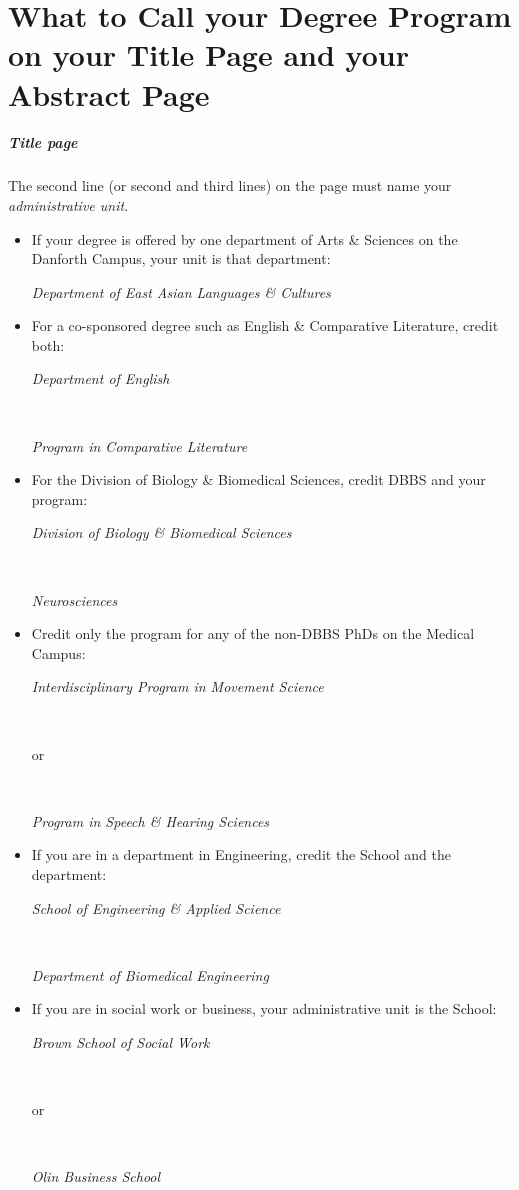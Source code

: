 \chapter[Degree Program]{What to Call your Degree Program on your Title Page and your Abstract Page}
\label{app:degree-program}

\paragraph{Title page}
The second line (or second and third lines) on the page must name your \emph{administrative unit}.

\begin{itemize}
\item If your degree is offered by one department of Arts \& Sciences on the Danforth Campus, your unit is that department: \\
\centerline{\emph{Department of East Asian Languages \& Cultures}}

\item For a co-sponsored degree such as English \& Comparative Literature, credit both: \\
\centerline{\emph{Department of English}}\\
\centerline{\emph{Program in Comparative Literature}}

\item For the Division of Biology \& Biomedical Sciences, credit DBBS and your program: \\
\centerline{\emph{Division of Biology \& Biomedical Sciences}}\\
\centerline{\emph{Neurosciences}}

\item Credit only the program for any of the non-DBBS PhDs on the Medical Campus: \\
\centerline{\emph{Interdisciplinary Program in Movement Science}}\\
\centerline{or}\\
\centerline{\emph{Program in Speech \& Hearing Sciences}}

\item If you are in a department in Engineering, credit the School and the department: \\
\centerline{\emph{School of Engineering \& Applied Science}}\\
\centerline{\emph{Department of Biomedical Engineering}}

\item If you are in social work or business, your administrative unit is the School: \\
\centerline{\emph{Brown School of Social Work}}\\
\centerline{or}\\
\centerline{\emph{Olin Business School}}
\end{itemize}

